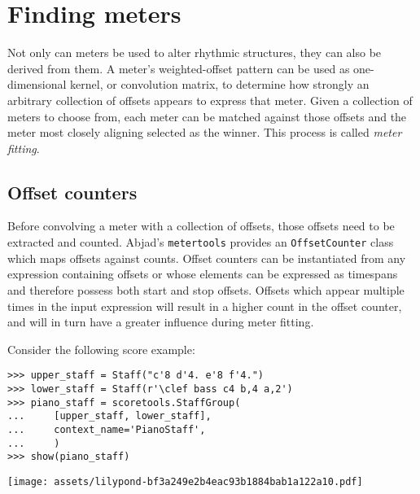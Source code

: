 \section{Finding meters}
\label{sec:finding-meters}

Not only can meters be used to alter rhythmic structures, they can also be
derived from them. A meter's weighted-offset pattern can be used as
one-dimensional kernel, or convolution matrix, to determine how strongly an
arbitrary collection of offsets appears to express that meter. Given a
collection of meters to choose from, each meter can be matched against those
offsets and the meter most closely aligning selected as the winner. This
process is called \emph{meter fitting}.

\subsection{Offset counters} %

Before convolving a meter with a collection of offsets, those offsets need to
be extracted and counted. Abjad's \texttt{metertools} provides an
\texttt{OffsetCounter} class which maps offsets against counts. Offset counters
can be instantiated from any expression containing offsets or whose elements
can be expressed as timespans and therefore possess both start and stop
offsets. Offsets which appear multiple times in the input expression will
result in a higher count in the offset counter, and will in turn have a greater
influence during meter fitting.

Consider the following score example:

\begin{comment}
<abjad>
upper_staff = Staff("c'8 d'4. e'8 f'4.")
lower_staff = Staff(r'\clef bass c4 b,4 a,2')
piano_staff = scoretools.StaffGroup(
    [upper_staff, lower_staff],
    context_name='PianoStaff',
    )
show(piano_staff)
</abjad>
\end{comment}

\begin{abjadbookoutput}
\begin{singlespacing}
\vspace{-0.5\baselineskip}
\begin{lstlisting}
>>> upper_staff = Staff("c'8 d'4. e'8 f'4.")
>>> lower_staff = Staff(r'\clef bass c4 b,4 a,2')
>>> piano_staff = scoretools.StaffGroup(
...     [upper_staff, lower_staff],
...     context_name='PianoStaff',
...     )
>>> show(piano_staff)
\end{lstlisting}
\noindent\texttt{[image: assets/lilypond-bf3a249e2b4eac93b1884bab1a122a10.pdf]}
\end{singlespacing}
\end{abjadbookoutput}

